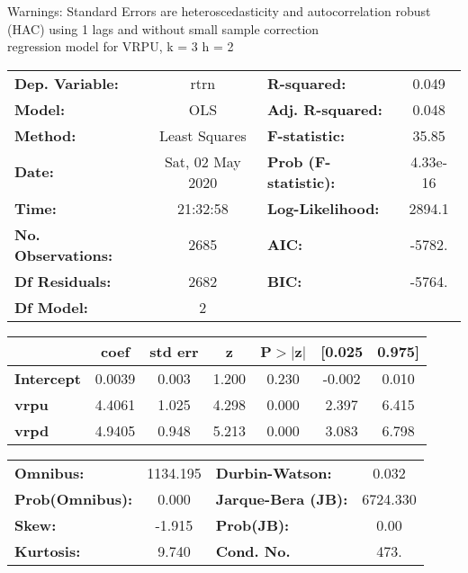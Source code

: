 Warnings: \newline
 [1] Standard Errors are heteroscedasticity and autocorrelation robust (HAC) using 1 lags and without small sample correction\\ 

regression model for VRPU, k = 3 h = 2\begin{center}
\begin{tabular}{lclc}
\toprule
\textbf{Dep. Variable:}    &       rtrn       & \textbf{  R-squared:         } &     0.049   \\
\textbf{Model:}            &       OLS        & \textbf{  Adj. R-squared:    } &     0.048   \\
\textbf{Method:}           &  Least Squares   & \textbf{  F-statistic:       } &     35.85   \\
\textbf{Date:}             & Sat, 02 May 2020 & \textbf{  Prob (F-statistic):} &  4.33e-16   \\
\textbf{Time:}             &     21:32:58     & \textbf{  Log-Likelihood:    } &    2894.1   \\
\textbf{No. Observations:} &        2685      & \textbf{  AIC:               } &    -5782.   \\
\textbf{Df Residuals:}     &        2682      & \textbf{  BIC:               } &    -5764.   \\
\textbf{Df Model:}         &           2      & \textbf{                     } &             \\
\bottomrule
\end{tabular}
\begin{tabular}{lcccccc}
                   & \textbf{coef} & \textbf{std err} & \textbf{z} & \textbf{P$> |$z$|$} & \textbf{[0.025} & \textbf{0.975]}  \\
\midrule
\textbf{Intercept} &       0.0039  &        0.003     &     1.200  &         0.230        &       -0.002    &        0.010     \\
\textbf{vrpu}      &       4.4061  &        1.025     &     4.298  &         0.000        &        2.397    &        6.415     \\
\textbf{vrpd}      &       4.9405  &        0.948     &     5.213  &         0.000        &        3.083    &        6.798     \\
\bottomrule
\end{tabular}
\begin{tabular}{lclc}
\textbf{Omnibus:}       & 1134.195 & \textbf{  Durbin-Watson:     } &    0.032  \\
\textbf{Prob(Omnibus):} &   0.000  & \textbf{  Jarque-Bera (JB):  } & 6724.330  \\
\textbf{Skew:}          &  -1.915  & \textbf{  Prob(JB):          } &     0.00  \\
\textbf{Kurtosis:}      &   9.740  & \textbf{  Cond. No.          } &     473.  \\
\bottomrule
\end{tabular}
\end{center}

